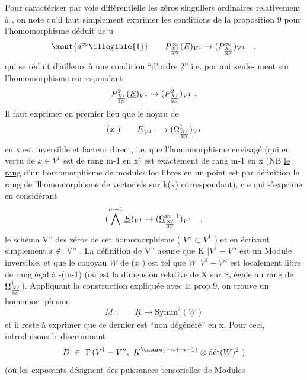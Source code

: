 
Pour caractériser par voie différentielle  les  zéros singuliers ordinaires
relativement à ,  on note qu'il faut simplement exprimer  les conditions
de la proposition 9  pour  l'homomorphisme  déduit de u
\[ \xout{d^{\infty}\illegible{1}} \qquad P^{\infty}_{X/\over{\$}{S}}(\underline{E})_{V^1}\to(P^{\infty}_{X/\over{\$}{S}})_{V^1} \quad , \]
qui se réduit d'ailleurs à une condition  ``d'ordre 2'' i.e. portant seule-%
ment sur l'homomorphisme correspondant
\[ P^{2}_{X/\over{\$}{S}}(\underline{E})_{V^1}\to(P^{2}_{X/\over{\$}{S}})_{V^1} \ . \]
Il faut exprimer en premier lieu  que  le noyau  de
\[ (\underline{x}\ ) \qquad \underline{E}_{V^1} \longrightarrow (\underline{\Omega}^{1}_{X/\over{\$}{S}})_{V^1} \]
en x est inversible et facteur direct, i.e. que l'homomorphisme envisagé
(qui en vertu de  $x\in V^1$ est  de rang  m-1 en x) est exactement de rang
\margin{(} m-1 en x  (NB \uline{le rang} d'un  homomorphisme de modules loc libres en un
point est par définition le rang de 'lhomomorphisme de vectoriels sur k(x)
correspondant), c e qui s'exprime en considérant
\[ (\bigwedge^{m-1} \underline{E})_{V^1}\to(\underline{\Omega}^{m-1}_{X/\over{\$}{S}})_{V^1} \quad , \]
le  schéma  V'' des zéros de cet homomorphisme  ( $V''\subset V^1$ )  et en écrivant
simplement $x\notin$ V'' .  La définition de V'' assure que  K $|V^1-V''$  est un
Module inversible,  et que  le conoyau  $\underline{W}$  de ($\underline{x}$ )  est tel que
$\underline{W}\,|V^1-V''$  est  localement libre de rang égal à  -(m-1)  (où  est la
dimension relative de X sur S, égale au rang de $\underline{\Omega}^{1}_{X/\over{\$}{S}}$).  Appliquant la
construction expliquée avec la prop.9\hand{$^{*}$}, on trouve  un homomor-%
phisme
\[ M\ : \qquad \underline{K} \longrightarrow \underline{\mathrm{Symm}}^{2}(\underline{W}) \]
et il reste à exprimer que ce dernier est ``non dégénéré'' en x. Pour ceci,
introduisons le  discriminant
\[ D\ \in\ \Gamma\,(V^1-V'',\ \underline{K}^{\unsure{-n+m-1}}\otimes \text{dét}(\underline{W})^{2}\ ) \]
(où les exposants désignent des puissances tensorielles de Modules

